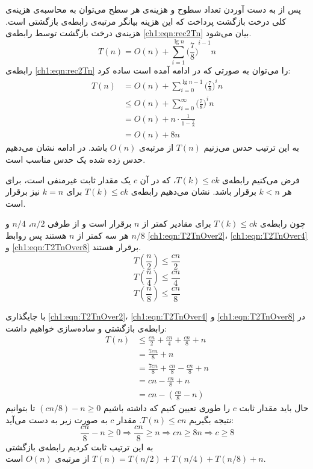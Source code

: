 {{پس از به دست آوردن تعداد سطوح و هزینه‌ی هر سطح می‌توان به محاسبه‌ی هزینه‌‌ی کلی درخت بازگشت پرداخت که این هزینه بیانگر مرتبه‌ی رابطه‌ی بازگشتی است. هزینه‌ی درخت بازگشت توسط رابطه‌ی {\eqref{ch1:eqn:rec2Tn}} بیان می‌شود.
\begin{equation}
T(n)=O(n) + \sum_{i=1}^{\lg n}{{\biggl( \frac{7}{8} \biggr)}^{i-1}n}\label{ch1:eqn:rec2Tn}
\end{equation}
رابطه‌ی {\eqref{ch1:eqn:rec2Tn}} را می‌توان به صورتی که در ادامه آمده است ساده کرد:
\begin{align*}
T(n) &= O(n) + \sum_{i=0}^{\lg n - 1}{{\biggl( \frac{7}{8} \biggr)}^{i}n}\\
		&\leq O(n) + \sum_{i=0}^{\infty}{{\biggl( \frac{7}{8} \biggr)}^in}\\
		&= O(n) + n\cdot\frac{1}{1-\frac{7}{8}}\\
		&= O(n) + 8n
\end{align*}
به این ترتیب حدس می‌زنیم {$T(n)$} از مرتبه‌ی {$O(n)$} باشد. در ادامه نشان می‌دهیم حدس زده شده یک حدس مناسب است.

فرض می‌کنیم رابطه‌ی {$T(k)\leqslant ck$}، که در آن {$c$} یک مقدار ثابت غیرمنفی است، برای هر {$k<n$} برقرار باشد. نشان می‌دهیم رابطه‌ی {$T(k)\leqslant ck$} برای {$k=n$} نیز برقرار است.

چون رابطه‌ی {$T(k)\leqslant ck$} برای مقادیر کمتر از {$n$}  برقرار است و از طرفی {$n/2$}، {$n/4$} و {$n/8$} هر سه کمتر از {$n$} هستند پس روابط {\eqref{ch1:eqn:T2TnOver2}}، {\eqref{ch1:eqn:T2TnOver4}} و {\eqref{ch1:eqn:T2TnOver8}} برقرار هستند.
\begin{equation}
T\left(\frac{n}{2}\right) \leq \frac{cn}{2}\label{ch1:eqn:T2TnOver2}
\end{equation}
\begin{equation}
T\left(\frac{n}{4}\right) \leq \frac{cn}{4}\label{ch1:eqn:T2TnOver4}
\end{equation}
\begin{equation}
T\left(\frac{n}{8}\right) \leq \frac{cn}{8}\label{ch1:eqn:T2TnOver8}
\end{equation}

با جایگذاری {\eqref{ch1:eqn:T2TnOver2}}، {\eqref{ch1:eqn:T2TnOver4}} و {\eqref{ch1:eqn:T2TnOver8}} در رابطه‌ی بازگشتی و ساده‌سازی خواهیم داشت:
\begin{align*}
T(n) &\leq \frac{cn}{2} + \frac{cn}{4} + \frac{cn}{8} + n\\
	 &= \frac{7cn}{8} + n\\
	 &= \frac{7cn}{8} + \frac{cn}{8} - \frac{cn}{8} + n\\
	 &= cn - \frac{cn}{8} + n\\
	 &= cn - \left(\frac{cn}{8} - n\right)
\end{align*}
حال باید مقدار ثابت {$c$} را طوری تعیین کنیم که داشته باشیم {$(cn/8) - n \geqslant 0$} تا بتوانیم نتیجه بگیریم {$T(n) \leqslant cn$}. مقدار {$c$} به صورت زیر به دست می‌آید:
\begin{displaymath}
\frac{cn}{8} - n \geq 0 \Rightarrow \frac{cn}{8} \geq n \Rightarrow cn \geq 8n \Rightarrow c \geq 8
\end{displaymath}
به این ترتیب ثابت کردیم رابطه‌ی بازگشتی {$T(n)=T(n/2)+T(n/4)+T(n/8)+n$} از مرتبه‌ی {$O(n)$} است.

}}
